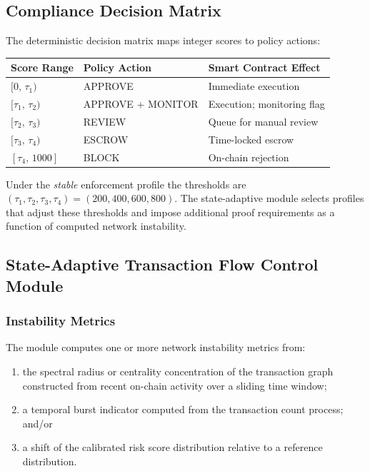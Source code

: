\documentclass[12pt,a4paper]{article}
\begin{document}
\subsection{Compliance Decision Matrix}

The deterministic decision matrix maps integer scores to policy actions:

\begin{center}
\begin{tabular}{lll}
\toprule
\textbf{Score Range} & \textbf{Policy Action} & \textbf{Smart
Contract Effect} \\
\midrule
$[0,\,\tau_1)$ & APPROVE & Immediate execution \\
$[\tau_1,\,\tau_2)$ & APPROVE + MONITOR & Execution; monitoring flag \\
$[\tau_2,\,\tau_3)$ & REVIEW & Queue for manual review \\
$[\tau_3,\,\tau_4)$ & ESCROW & Time-locked escrow \\
$[\tau_4,\,1000]$ & BLOCK & On-chain rejection \\
\bottomrule
\end{tabular}
\end{center}

Under the \emph{stable} enforcement profile the thresholds are $(\tau_1,
\tau_2, \tau_3, \tau_4) = (200,400,600,800)$. The state-adaptive module
selects profiles that adjust these thresholds and impose additional proof
requirements as a function of computed network instability.

\subsection{State-Adaptive Transaction Flow Control Module}
\label{sec:af}

\subsubsection{Instability Metrics}

The module computes one or more network instability metrics from:
\begin{enumerate}[label=(\alph*)]
\item the spectral radius or centrality concentration of the transaction
graph constructed from recent on-chain activity over a sliding time window;
\item a temporal burst indicator computed from the transaction count process;
and/or
\item a shift of the calibrated risk score distribution relative to a
reference distribution.
\end{enumerate}
\end{document}
